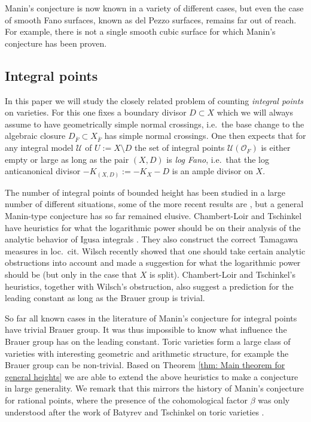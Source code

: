 \documentclass[a4paper,11pt,reqno]{amsart}
\theoremstyle{definition}
\begin{document}
Manin's conjecture is now known in a variety of different cases, but even the case of smooth Fano surfaces, known as del Pezzo surfaces, remains far out of reach. For example, there is not a single smooth cubic surface for which Manin's conjecture has been proven. 
\subsection{Integral points}
In this paper we will study the closely related problem of counting \emph{integral points} on varieties. For this one fixes a boundary divisor $D \subset X$ which we will always assume to have geometrically simple normal crossings, i.e.~the base change to the algebraic closure $D_{\overline{F}} \subset X_{\overline{F}}$ has simple normal crossings. One then expects that for any integral model $\mathcal{U}$ of $U := X \setminus D$ the set of integral points $\mathcal{U}(\mathcal{O}_F)$ is either empty or large as long as the pair $(X, D)$ is \emph{log Fano}, i.e.~that the log anticanonical divisor $-K_{(X,D)} := -K_X - D$ is an ample divisor on $X$. 

The number of integral points of bounded height has been studied in a large number of different situations, some of the more recent results are \cite{Chambert2012Integral, Takloo2013Integral, Chow2019Distribution, Wilsch2022Integral,Derenthal2022Integral, Wilsch2023Integral}, but a general Manin-type conjecture has so far remained elusive. Chambert-Loir and Tschinkel have heuristics for what the logarithmic power should be on their analysis of the analytic behavior of Igusa integrals \cite[\S4.4]{Chambert-Loir2010Igusa}. They also construct the correct Tamagawa measures in loc.~cit. Wilsch recently showed that one should take certain analytic obstructions into account and made a suggestion for what the logarithmic power should be \cite[\S2.5]{Wilsch2022Integral} (but only in the case that $X$ is split). Chambert-Loir and Tschinkel's heuristics, together with Wilsch's obstruction, also suggest a prediction for the leading constant as long as the Brauer group is trivial.

So far all known cases in the literature of Manin's conjecture for integral points have trivial Brauer group. It was thus impossible to know what influence the Brauer group has on the leading constant. Toric varieties form a large class of varieties with interesting geometric and arithmetic structure, for example the Brauer group can be non-trivial. Based on Theorem \ref{thm: Main theorem for general heights} we are able to extend the above heuristics to make a conjecture in large generality. We remark that this mirrors the history of Manin's conjecture for rational points, where the presence of the cohomological factor $\beta$ was only understood after the work of Batyrev and Tschinkel on toric varieties \cite{Batyrev1998Manin}.
\end{document}
